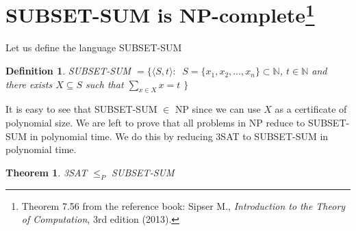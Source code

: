 \documentclass{article}
\newcommand{\theoremname}{Theorem}
\newcommand{\definitionname}{Definition}
\newtheorem{theorem}{\theoremname}
\newtheorem{definition}{\definitionname}
\newcommand{\st}{\colon\,}
\newcommand{\N}{\mathbb{N}}
\begin{document}
\section{SUBSET-SUM is NP-complete\footnote{%
Theorem 7.56 from the reference book: Sipser M.,
\emph{Introduction to the Theory of Computation}, 3rd edition (2013).}}
Let us define the language SUBSET-SUM
\begin{definition}
	SUBSET-SUM \(= \{\langle S, t\rangle \st\)
	\(S = \{x_1,x_2,\ldots,x_n\} \subset \N\),
	\(t \in \N\) and there exists \(X \subseteq S\) such that
	\(\sum_{x \in X} x = t\)
	\(\}\)
\end{definition}
It is easy to see that SUBSET-SUM \(\in\) NP since we can use \(X\) as a
certificate of polynomial size.
We are left to prove that all problems in NP reduce to SUBSET-SUM in polynomial
time. We do this by reducing 3SAT to SUBSET-SUM in polynomial time.
\begin{theorem}
	3SAT \(\le_P\) SUBSET-SUM
\end{theorem}
\end{document}
